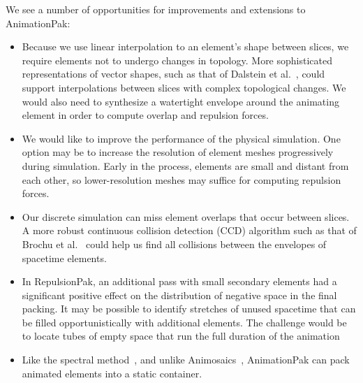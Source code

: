 \nnewtext
{
We see a number of opportunities for improvements and extensions to AnimationPak:}
\begin{itemize}
\item {}
Because we use linear interpolation to  an element's shape
  between slices, we require elements not to undergo changes in 
  topology.  More sophisticated representations of vector shapes,
  such as that of Dalstein et al.~\cite{Dalstein2015}, could support
  interpolations between slices with complex topological changes.
  We would also need to synthesize a watertight envelope around the
  animating element in order to compute overlap and repulsion forces.

\item {}
We would like to improve the performance of the physical simulation.
  One option may be to increase the resolution of element meshes 
  progressively during simulation.  Early in the process, elements are
  small and distant from each other, so lower-resolution
  meshes may suffice for computing repulsion forces.

\item {}
  Our discrete simulation can miss element overlaps that occur between
  slices.  A more robust continuous collision detection (CCD) algorithm
  such as that of Brochu et al.~\cite{Brochu2012}
  could help us find all collisions between
  the envelopes of spacetime elements.

\item {}
In RepulsionPak, an additional pass with
  small secondary elements had a significant positive effect on the
  distribution of negative space in the final packing.  It may be
  possible to identify stretches of unused spacetime that can be filled
  opportunistically with additional elements.  The challenge would be
  to locate tubes of empty space that run the full duration of the animation

\item {}
Like the spectral method~\cite{Dalal2006}, and unlike
  Animosaics~\cite{Smith2005}, AnimationPak can pack animated 
  elements into a static container. 
\end{itemize}



